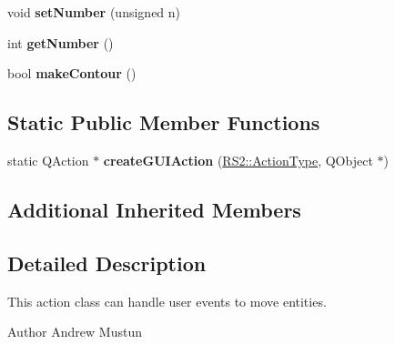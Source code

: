 \begin{DoxyCompactItemize}
\item 
\hypertarget{classRS__ActionPolylineEquidistant_a54a3b5aee6fff973d5d22bf9e1725de5}{void {\bfseries set\-Number} (unsigned n)}\label{classRS__ActionPolylineEquidistant_a54a3b5aee6fff973d5d22bf9e1725de5}

\item 
\hypertarget{classRS__ActionPolylineEquidistant_a2c35efac3a47a79408d878cc830304ae}{int {\bfseries get\-Number} ()}\label{classRS__ActionPolylineEquidistant_a2c35efac3a47a79408d878cc830304ae}

\item 
\hypertarget{classRS__ActionPolylineEquidistant_a4eb1df5248127d2304de4d0b098c571b}{bool {\bfseries make\-Contour} ()}\label{classRS__ActionPolylineEquidistant_a4eb1df5248127d2304de4d0b098c571b}

\end{DoxyCompactItemize}
\subsection*{Static Public Member Functions}
\begin{DoxyCompactItemize}
\item 
\hypertarget{classRS__ActionPolylineEquidistant_aebcff4a1820945cf9b177f5daa206d94}{static Q\-Action $\ast$ {\bfseries create\-G\-U\-I\-Action} (\hyperlink{classRS2_afe3523e0bc41fd637b892321cfc4b9d7}{R\-S2\-::\-Action\-Type}, Q\-Object $\ast$)}\label{classRS__ActionPolylineEquidistant_aebcff4a1820945cf9b177f5daa206d94}

\end{DoxyCompactItemize}
\subsection*{Additional Inherited Members}


\subsection{Detailed Description}
This action class can handle user events to move entities.

\begin{DoxyAuthor}{Author}
Andrew Mustun 
\end{DoxyAuthor}


